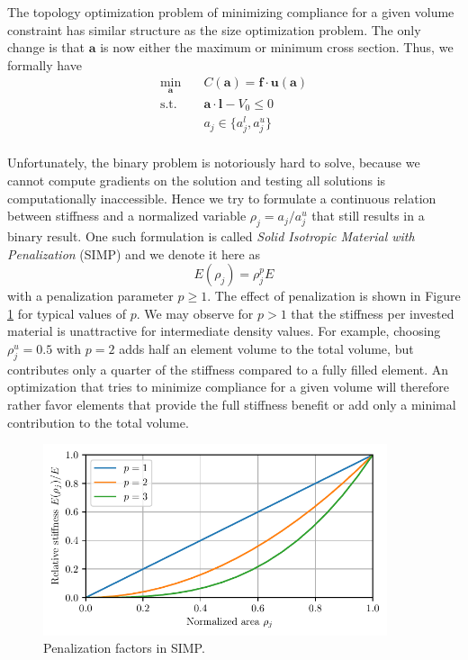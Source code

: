 The topology optimization problem of minimizing compliance for a given volume constraint has similar structure as the size optimization problem. The only change is that $\mathbf{a}$ is now either the maximum or minimum cross section. Thus, we formally have 
\begin{equation}
    \begin{aligned}
        \min_{\mathbf{a}} \quad & C(\mathbf{a}) = \mathbf{f} \cdot \mathbf{u}(\mathbf{a})\\
        \textrm{s.t.} \quad & \mathbf{a} \cdot \mathbf{l} - V_0 \le 0  \\
                            & a_j \in \{a_j^l, a_j^u\}\\
    \end{aligned}
\end{equation}

Unfortunately, the binary problem is notoriously hard to solve, because we cannot compute gradients on the solution and testing all solutions is computationally inaccessible. Hence we try to formulate a continuous relation between stiffness and a normalized variable $\rho_j = a_j/a_j^u$ that still results in a binary result. One such formulation is called \emph{Solid Isotropic Material with Penalization} (SIMP) and we denote it here as 
\begin{equation}
    E(\rho_j)= \rho_j^p E
\end{equation}
with a penalization parameter $p \ge 1$. 
The effect of penalization is shown in Figure \ref{fig:simp_truss} for typical values of $p$. We may observe for $p>1$ that the stiffness per invested material is unattractive for intermediate density values. For example, choosing $\rho_j^u=0.5$ with $p=2$ adds half an element volume to the total volume, but contributes only a quarter of the stiffness compared to a fully filled element. An optimization that tries to minimize compliance for a given volume will therefore rather favor elements that provide the full stiffness benefit or add only a minimal contribution to the total volume.

\begin{figure}[!htpb]
    \centering
    \includegraphics[width=0.9\textwidth]{figures/simp_truss.pdf}
    \caption{Penalization factors in SIMP.}
    \label{fig:simp_truss}
\end{figure}

